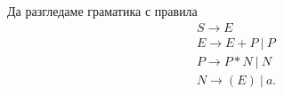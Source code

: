 \begin{example}
  Да разгледаме граматика с правила
  \begin{align*}
    & S \to E\\
    & E \to E + P\ |\ P\\
    & P \to P * N\ |\ N\\
    & N \to (E)\ |\ a.
  \end{align*}
\end{example}


